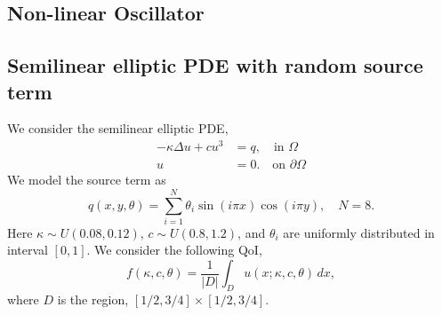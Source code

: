 \subsection{Non-linear Oscillator}

\subsection{Semilinear elliptic PDE with random source term}

We consider the semilinear elliptic PDE,
\begin{equation}\label{equ:semilinear}
\begin{aligned}
-\kappa \Delta u + c u^3 &= q, \quad \text{in } \Omega\\
 u &= 0. \quad \text{on } \partial \Omega
\end{aligned}
\end{equation}
We model the source term as 
\begin{equation}
q(x, y, \theta) = \sum_{i = 1}^N \theta_i \sin(i \pi x)
\cos(i \pi y),
\quad N = 8.
\end{equation}
Here $\kappa \sim U(0.08, 0.12)$, $c \sim U(0.8, 1.2)$, 
and $\theta_i$ are uniformly distributed in interval $[0, 1]$. We consider
the following QoI,
\[
     f(\kappa, c, \theta) = \frac{1}{|D|} \int_D u(x; \kappa, c, \theta) \, dx, 
\]
where $D$ is the region, $[1/2, 3/4] \times [1/2, 3/4]$.

































